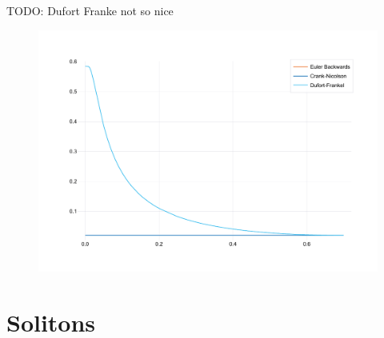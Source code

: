\documentclass[
	a4paper, %
	10pt, %
]{CSUniSchoolLabReport}
\begin{document}
TODO: Dufort Franke not so nice
\begin{figure}[H]
	\centering
	\includegraphics[width=\textwidth]{../saves_t2/error_comp_be_cn_df.pdf}
	\caption{}
\end{figure}


\section{Solitons}








\end{document}
